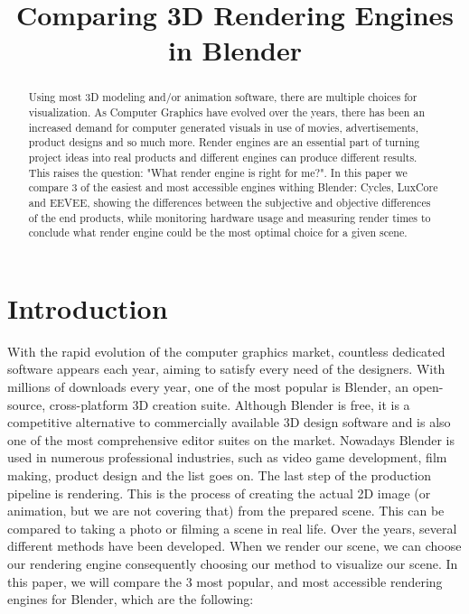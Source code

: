 \documentclass[conference]{IEEEtran}
\begin{document}
\title{Comparing 3D Rendering Engines in Blender}

\author{
\and
{}
}

\maketitle

\tableofcontents


\begin{abstract}
Using most 3D modeling and/or animation software, there are multiple choices for visualization. As Computer Graphics have evolved over the years, there has been an increased demand for computer generated visuals in use of movies, advertisements, product designs and so much more. Render engines are an essential part of turning project ideas into real products and different engines can produce different results. This raises the question: "What render engine is right for me?". In this paper we compare 3 of the easiest and most accessible engines withing Blender: Cycles, LuxCore and EEVEE, showing the differences between the subjective and objective differences of the end products, while monitoring hardware usage and measuring render times to conclude what render engine could be the most optimal choice for a given scene.
\end{abstract}


\section{Introduction}
With the rapid evolution of the computer graphics market, countless dedicated software appears each year, aiming to satisfy every need of the designers. With millions of downloads every year, one of the most popular is Blender, an open-source, cross-platform 3D creation suite. Although Blender is free, it is a competitive alternative to commercially available 3D design software and is also one of the most comprehensive editor suites on the market. Nowadays Blender is used in numerous professional industries, such as video game development, film making, product design and the list goes on.
The last step of the production pipeline is rendering. This is the process of creating the actual 2D image (or animation, but we are not covering that) from the prepared scene. This can be compared to taking a photo or filming a scene in real life. Over the years, several different methods have been developed. When we render our scene, we can choose our rendering engine consequently choosing our method to visualize our scene.
In this paper, we will compare the 3 most popular, and most accessible rendering engines for Blender, which are the following:
\end{document}
